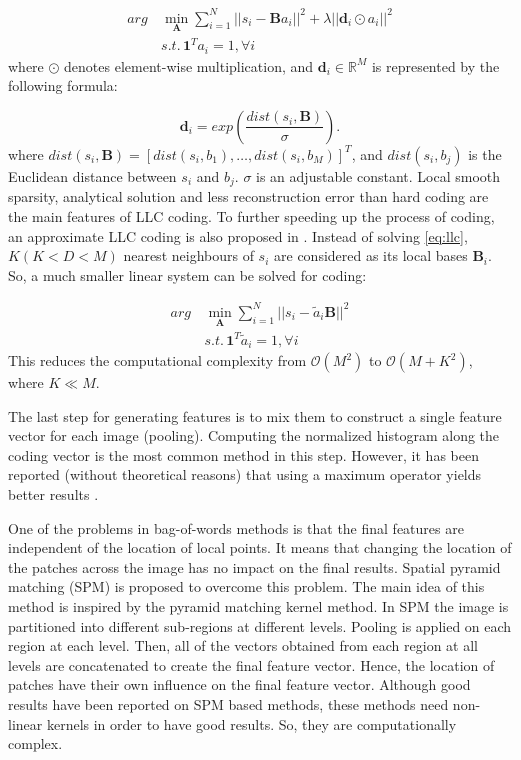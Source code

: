 \documentclass[a4paper,12pt]{article}
\begin{document}
\begin{align}
arg\,&\min_{\mathbf{A}} \sum_{i=1}^{N} || s_i - \mathbf{B}a_i ||^{2} + \lambda|| \mathbf{d}_i \odot a_i ||^2 \label{eq:llc}\\
 & s.t.\, \mathbf{1}^{T}a_i = 1, \forall i \nonumber
\end{align}
where $\odot$ denotes element-wise multiplication, and $\mathbf{d}_i \in \mathbb{R}^M$ is represented by the following formula:

\begin{equation}
\mathbf{d}_i  = exp\left(\frac{dist(s_i,\mathbf{B})}{\sigma}\right).
\end{equation}
where $dist(s_i,\mathbf{B}) = [dist(s_i,b_1),\ldots,dist(s_i,b_M)]^T$, and $dist(s_i,b_j)$ is the Euclidean distance between $s_i$ and $b_j$. $\sigma$ is an adjustable constant. Local smooth sparsity, analytical solution and less reconstruction error than hard coding are the main features of LLC coding. To further speeding up the process of coding, an approximate LLC coding is also proposed in \cite{shaban6}. Instead of solving \ref{eq:llc}, $K ( K < D < M)$ nearest neighbours of $s_i$ are considered as its local bases $\mathbf{B}_i$. So, a much smaller linear system can be solved for coding:

\begin{align}
arg\,&\min_{\mathbf{A}} \sum_{i=1}^{N} || s_i - \tilde{a}_i\mathbf{B} ||^{2} \\
 & s.t.\, \mathbf{1}^{T}\tilde{a}_i = 1, \forall i \nonumber
\end{align}
This reduces the computational complexity from $\mathcal{O}(M^2)$ to $\mathcal{O}(M+K^2)$, where $K \ll M$.

The last step for generating features is to mix them to construct a single feature vector for each image (pooling). Computing the normalized histogram along the coding vector is the most common method in this step. However, it has been reported (without theoretical reasons) that using a maximum operator yields better results \cite{LLC22}.

One of the problems in bag-of-words methods is that the final features are independent of the  location of local points. It means that changing the location of the patches across the image has no impact on the final results. Spatial pyramid matching (SPM)\cite{shaban9}  is proposed to overcome this problem. The main idea of this method is inspired by the pyramid matching kernel \cite{shaban20} method. In SPM the image is partitioned into different sub-regions at different levels. Pooling is applied on each region at each level. Then, all of the vectors obtained from each region at all levels are concatenated to create the final feature vector. Hence, the location of patches have their own influence on the final feature vector. Although good results have been reported on SPM based methods, these methods need non-linear kernels in order to have good results. So, they are computationally complex.
\end{document}
